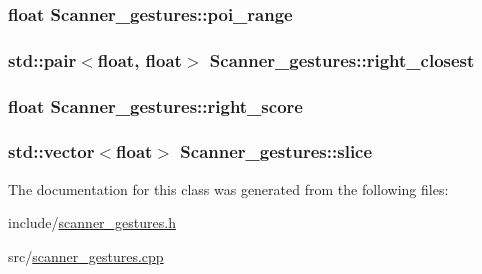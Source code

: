 \subsubsection[{\texorpdfstring{poi\+\_\+range}{poi_range}}]{\setlength{\rightskip}{0pt plus 5cm}float Scanner\+\_\+gestures\+::poi\+\_\+range\hspace{0.3cm}{\ttfamily [private]}}\hypertarget{class_scanner__gestures_a55694caa26cbfbc83f349a11a15a6980}{}\label{class_scanner__gestures_a55694caa26cbfbc83f349a11a15a6980}
\subsubsection[{\texorpdfstring{right\+\_\+closest}{right_closest}}]{\setlength{\rightskip}{0pt plus 5cm}std\+::pair$<$float, float$>$ Scanner\+\_\+gestures\+::right\+\_\+closest\hspace{0.3cm}{\ttfamily [private]}}\hypertarget{class_scanner__gestures_ad51010037fec39cc18a5ccd23bb52d02}{}\label{class_scanner__gestures_ad51010037fec39cc18a5ccd23bb52d02}
\subsubsection[{\texorpdfstring{right\+\_\+score}{right_score}}]{\setlength{\rightskip}{0pt plus 5cm}float Scanner\+\_\+gestures\+::right\+\_\+score\hspace{0.3cm}{\ttfamily [private]}}\hypertarget{class_scanner__gestures_ac70d55167bb745213abadfb06a615e91}{}\label{class_scanner__gestures_ac70d55167bb745213abadfb06a615e91}
\subsubsection[{\texorpdfstring{slice}{slice}}]{\setlength{\rightskip}{0pt plus 5cm}std\+::vector$<$float$>$ Scanner\+\_\+gestures\+::slice\hspace{0.3cm}{\ttfamily [private]}}\hypertarget{class_scanner__gestures_af41d7e1707fce466c71119a52999913a}{}\label{class_scanner__gestures_af41d7e1707fce466c71119a52999913a}


The documentation for this class was generated from the following files\+:\begin{DoxyCompactItemize}
\item 
include/\hyperlink{scanner__gestures_8h}{scanner\+\_\+gestures.\+h}\item 
src/\hyperlink{scanner__gestures_8cpp}{scanner\+\_\+gestures.\+cpp}\end{DoxyCompactItemize}
